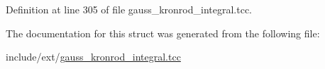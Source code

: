 Definition at line 305 of file gauss\+\_\+kronrod\+\_\+integral.\+tcc.



The documentation for this struct was generated from the following file\+:\begin{DoxyCompactItemize}
\item 
include/ext/\hyperlink{gauss__kronrod__integral_8tcc}{gauss\+\_\+kronrod\+\_\+integral.\+tcc}\end{DoxyCompactItemize}

